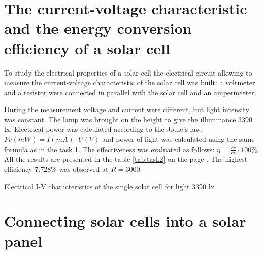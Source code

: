 \documentclass[12pt, letterpaper]{article}
\begin{document}
\newpage
\section{The current-voltage characteristic and the energy conversion efficiency of a solar cell}
To study the electrical properties of a solar cell the electrical circuit allowing to measure the current-voltage characteristic of the solar cell was built: a voltmeter and a resistor were connected in parallel with the solar cell and an ampermeeter.
\par
During the measurement voltage and current were different, but light intensity was constant. The lamp was brought on the height to give the illuminance 3390 lx. Electrical power was calculated
according to the Joule's law: $Pe (mW) = I(mA) \cdot U(V)$ and power of light was calculated using the same formula as in the task 1. The effectiveness was evaluated as follows: $\eta = \frac{Pe}{Pv} \cdot 100 \%$. All the results are presented in the table \ref{tab:task2} on the page \pageref{tab:task2}. The highest efficiency $7.728\%$ was observed at $R = 3000$.

\begin{table}[htb]
\centering
{}
\caption{Electrical I-V characteristics of the single solar cell for light 3390 lx}
\label{tab:task2}
\end{table}
\newpage
\section{Connecting solar cells into a solar panel}
\end{document}
